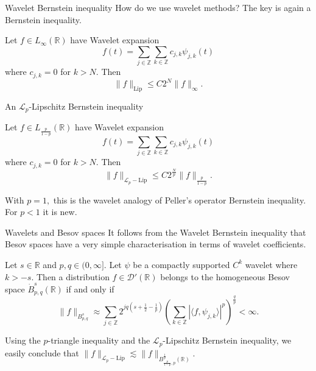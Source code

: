 \documentclass{beamer}
\numberwithin{equation}{section}
\theoremstyle{plain}
\theoremstyle{plain}
\theoremstyle{definition}
\theoremstyle{plain}
\theoremstyle{plain}
\theoremstyle{definition}
\newcommand{\Rl}{\mathbb{R}}
\newcommand{\Itgr}{\mathbb{Z}}
\newcommand{\Dc}{\mathcal{D}}
\newcommand{\Lc}{\mathcal{L}}
\begin{document}
\begin{frame}{Wavelet Bernstein inequality}
    How do we use wavelet methods? The key is again a Bernstein inequality.
    \begin{theorem}[Meyer(?) (1980s)]
        Let $f\in L_{\infty}(\Rl)$ have Wavelet expansion
        \[
            f(t) = \sum_{j\in \Itgr} \sum_{k\in \Itgr} c_{j,k}\psi_{j,k}(t)
        \]
        where $c_{j,k}=0$ for $k>N.$ Then
        \[
            \|f\|_{\mathrm{Lip}} \leq C2^N \|f\|_{\infty}.
        \]
    \end{theorem}
\end{frame}

\begin{frame}{An $\Lc_p$-Lipschitz Bernstein inequality}
        \begin{theorem}[M.-Sukochev (2022)]
        Let $f\in L_{\frac{p}{1-p}}(\Rl)$ have Wavelet expansion
        \[
            f(t) = \sum_{j\in \Itgr} \sum_{k\in \Itgr} c_{j,k}\psi_{j,k}(t)
        \]
        where $c_{j,k}=0$ for $k>N.$ Then
        \[
            \|f\|_{\Lc_p-\mathrm{Lip}} \leq C2^{\frac{N}{p}} \|f\|_{\frac{p}{1-p}}.
        \]
    \end{theorem}
    With $p=1,$ this is the wavelet analogy of Peller's operator Bernstein inequality. For $p<1$ it is new.
\end{frame}

\begin{frame}{Wavelets and Besov spaces}
    It follows from the Wavelet Bernstein inequality that Besov spaces have a very simple characterisation in terms of wavelet coefficients.
    \begin{theorem}[Meyer (1986)]
        Let $s \in \Rl$ and $p,q\in (0,\infty].$ Let $\psi$ be a compactly supported $C^k$ wavelet where $k > -s.$ Then a distribution $f\in \Dc'(\Rl)$
        belongs to the homogeneous Besov space $\dot{B}^{s}_{p,q}(\Rl)$ if and only if
        \begin{equation*}
            \|f\|_{B^s_{p,q}}\approx \sum_{j\in \Itgr} 2^{jq(s+\frac{1}{2}-\frac{1}{p})}\left(\sum_{k\in \Itgr} |\langle f,\psi_{j,k}\rangle|^p\right)^{\frac{q}{p}} < \infty.
        \end{equation*}
    \end{theorem}
    Using the $p$-triangle inequality and the $\Lc_p$-Lipschitz Bernstein inequality, we easily conclude that $\|f\|_{\Lc_p-\mathrm{Lip}} \lesssim \|f\|_{B^{\frac1p}_{\frac{p}{1-p},p}(\Rl)}.$
\end{frame}


\begin{frame}
\end{frame}
\end{document}
